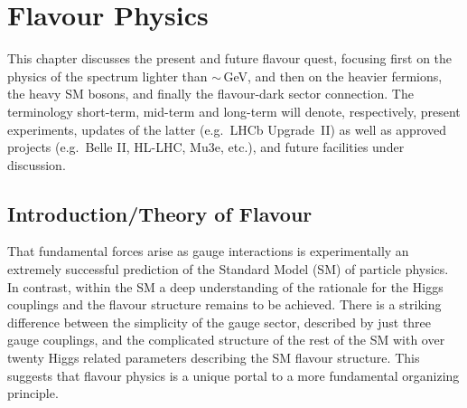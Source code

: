 \documentclass[../report.tex]{subfiles}
\begin{document}
\linenumbers
\chapter{Flavour Physics}
\label{chap:flav}

This chapter discusses the present and future flavour quest, focusing first on the physics of the spectrum lighter than $\sim$\,GeV, and then on the heavier fermions, 
 the heavy SM bosons, and finally the flavour-dark sector connection. The terminology short-term, mid-term and long-term will denote, respectively, present experiments, updates of the latter (e.g.\ LHCb Upgrade~II) as well as approved projects (e.g.\ Belle II, HL-LHC, Mu3e, etc.), and future facilities under discussion.  

\section{Introduction/Theory of Flavour}
That fundamental forces arise as gauge interactions is experimentally an extremely successful prediction of the
Standard Model (SM) of particle physics. 
In contrast, within the SM 
a deep understanding of the rationale for the Higgs couplings and the flavour structure remains to be achieved.  There is a striking difference between the simplicity of the gauge sector, described by just three gauge couplings, and the complicated structure of the rest of the SM with over twenty Higgs related parameters describing the SM flavour structure. This  suggests that flavour physics
is  a unique portal to 
a more fundamental organizing principle. 
\end{document}
